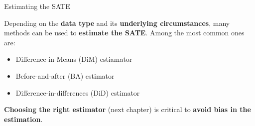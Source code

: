 \documentclass[aspectratio=169]{beamer}
\begin{document}


    
    


\begin{frame}{Estimating the SATE}

    Depending on the \textbf{data type} and its \textbf{underlying circumstances}, many methods can be used to \textbf{estimate the SATE}. Among the most common ones are:
    \vspace{0.2cm}
    
    \begin{itemize}
        \item Difference-in-Means (DiM) estiamator
        \item Before-and-after (BA) estimator
        \item Difference-in-differences (DiD) estimator
    \end{itemize}
    \vspace{0.2cm}

    \textbf{Choosing the right estimator} (next chapter) is critical to \textbf{avoid bias in the estimation}.
        
\end{frame}
\end{document}
